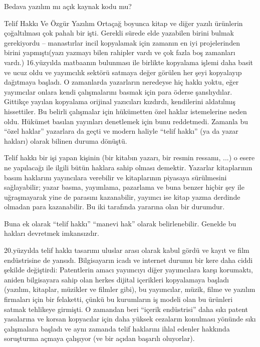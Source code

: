 \begin{section}{Bedava yazılım mı açık kaynak kodu mu?}
\begin{subsection}{Telif Hakkı Ve Özgür Yazılım}
Ortaçağ boyunca kitap ve   diğer yazılı ürünlerin çoğaltılması çok pahalı bir işti. Gerekli sürede elde yazabilen birini bulmak gerekiyordu -- manastırlar incil kopyalamak için zamanın en iyi projelerinden birini yapmıştı(yazı yazmayı bilen rahipler vardı ve çok fazla boş zamanları vardı.) 16.yüzyılda matbaanın bulunması ile birlikte kopyalama işlemi daha basit ve ucuz oldu ve yayımcılık sektörü satmaya değer görülen her şeyi kopyalayıp dağıtmaya başladı. O zamanlarda yazarların neredeyse hiç hakkı yoktu, eğer yayımcılar onlara kendi çalışmalarını basmak için para öderse şanslıydılar. Gittikçe yayılan kopyalama orijinal yazıcıları kızdırdı, kendilerini aldatılmış hissettiler. Bu belirli çalışmalar için hükümetten özel haklar istemelerine neden oldu. Hükümet basılan yayınları denetlemek için bunu reddetmedi. Zamanla bu “özel haklar” yazarlara da geçti ve modern haliyle “telif hakkı” (ya da yazar hakları) olarak bilinen duruma dönüştü.

Telif hakkı bir işi yapan kişinin (bir kitabın yazarı, bir resmin ressamı, ...) o esere ne yapılacağı ile ilgili bütün haklara sahip olması demektir. Yazarlar kitaplarının basım haklarını yayıncılara verebilir ve kitaplarının piyasaya sürülmesini sağlayabilir; yazar basma, yayımlama, pazarlama ve buna benzer hiçbir şey ile uğraşmayarak yine de parasını kazanabilir, yayımcı ise kitap yazma derdinde olmadan para kazanabilir. Bu iki tarafında yararına olan bir durumdur.

Buna ek olarak “telif hakkı” “manevi hak” olarak belirlenebilir. Genelde bu hakları devretmek imkansızdır.

20.yüzyılda telif hakkı tasarımı uluslar arası olarak kabul gördü ve kayıt ve film endüstrisine de yansıdı. Bilgisayarın icadı ve internet durumu bir kere daha ciddi şekilde değiştirdi: Patentlerin amacı yayımcıyı diğer yayımcılara karşı korumaktı, aniden bilgisayara sahip olan herkes dijital içerikleri kopyalamaya başladı (yazılım, kitaplar, müzikler ve filmler gibi), bu yayımcılar, müzik, filme ve yazılım firmaları için bir felaketti, çünkü bu kurumların iş modeli olan bu ürünleri satmak tehlikeye girmişti. O zamandan beri “içerik endüstrisi” daha sıkı patent yasalarına ve korsan kopyacılar için daha yüksek cezaların konulması yönünde sıkı çalışmalara başladı ve aynı zamanda telif haklarını ihlal edenler hakkında soruşturma açmaya çalışıyor (ve bir açıdan başarılı oluyorlar).


\end{subsection}
\end{section}
